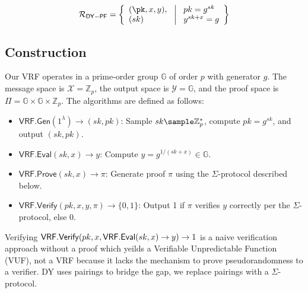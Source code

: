 \[
\mathcal{R}_{\mathsf{DY-PF}} = \left\{ 
\begin{array}{l} 
(\pk, x, y),\\
(sk) 
\end{array}
\ \middle|
\ \begin{array}{l}
pk = g^{sk} \\
y^{sk + x} = g  \\
\end{array} \right\}
\]

\subsection{Construction}\label{sec-dy-pf}

Our VRF operates in a prime-order group $\mathbb{G}$ of order $p$ with generator $g$. The message space is $\mathcal{X} = \mathbb{Z}_p$, the output space is $\mathcal{Y} = \mathbb{G}$, and the proof space is $\Pi = \mathbb{G} \times \mathbb{G} \times \mathbb{Z}_p$. The algorithms are defined as follows:

\begin{itemize}
    \item $\mathsf{VRF.Gen}(1^\lambda) \to (sk, pk)$: Sample $sk \sample \mathbb{Z}_p^*$, compute $pk = g^{sk}$, and output $(sk, pk)$.
    \item $\mathsf{VRF.Eval}(sk, x) \to y$: Compute $y = g^{1/(sk + x)} \in \mathbb{G}$.
    \item $\mathsf{VRF.Prove}(sk, x) \to \pi$: Generate proof $\pi$ using the $\Sigma$-protocol described below.
    \item $\mathsf{VRF.Verify}(pk, x, y, \pi) \to \{0, 1\}$: Output 1 if $\pi$ verifies $y$ correctly per the $\Sigma$-protocol, else 0.
\end{itemize}

\begin{remark}
    Verifying $\mathsf{VRF.Verify}(pk, x, \mathsf{VRF.Eval}(sk, x) \to y) \to 1$ is a naive verification approach without a proof which yeilds a Verifiable Unpredictable Function (VUF), not a VRF because it lacks the mechanism to prove pseudorandomness to a verifier. DY uses pairings to bridge the gap, we replace pairings with a $\Sigma$-protocol. 
\end{remark}

